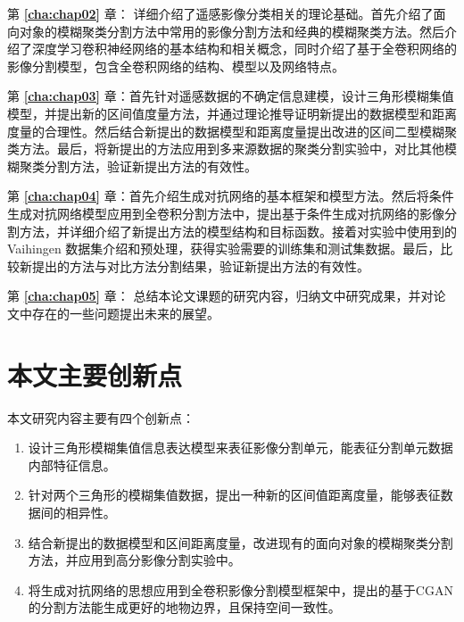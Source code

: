 第 \textbf{\ref{cha:chap02}} 章： 详细介绍了遥感影像分类相关的理论基础。首先介绍了面向对象的模糊聚类分割方法中常用的影像分割方法和经典的模糊聚类方法。然后介绍了深度学习卷积神经网络的基本结构和相关概念，同时介绍了基于全卷积网络的影像分割模型，包含全卷积网络的结构、模型以及网络特点。

第 \textbf{\ref{cha:chap03}} 章：首先针对遥感数据的不确定信息建模，设计三角形模糊集值模型，并提出新的区间值度量方法，并通过理论推导证明新提出的数据模型和距离度量的合理性。然后结合新提出的数据模型和距离度量提出改进的区间二型模糊聚类方法。最后，将新提出的方法应用到多来源数据的聚类分割实验中，对比其他模糊聚类分割方法，验证新提出方法的有效性。

第 \textbf{\ref{cha:chap04}} 章：首先介绍生成对抗网络的基本框架和模型方法。然后将条件生成对抗网络模型应用到全卷积分割方法中，提出基于条件生成对抗网络的影像分割方法，并详细介绍了新提出方法的模型结构和目标函数。接着对实验中使用到的Vaihingen 数据集介绍和预处理，获得实验需要的训练集和测试集数据。最后，比较新提出的方法与对比方法分割结果，验证新提出方法的有效性。

第 \textbf{\ref{cha:chap05}} 章： 总结本论文课题的研究内容，归纳文中研究成果，并对论文中存在的一些问题提出未来的展望。


\section{本文主要创新点}
\label{sec:forth}
本文研究内容主要有四个创新点：
\begin{enumerate}[(1)]
    \item 设计三角形模糊集值信息表达模型来表征影像分割单元，能表征分割单元数据内部特征信息。
    \item 针对两个三角形的模糊集值数据，提出一种新的区间值距离度量，能够表征数据间的相异性。
    \item 结合新提出的数据模型和区间距离度量，改进现有的面向对象的模糊聚类分割方法，并应用到高分影像分割实验中。
    \item 将生成对抗网络的思想应用到全卷积影像分割模型框架中，提出的基于CGAN 的分割方法能生成更好的地物边界，且保持空间一致性。

\end{enumerate}
